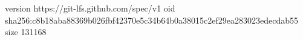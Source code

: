 version https://git-lfs.github.com/spec/v1
oid sha256:c8b18aba88369b026fbf42370e5c34b64b0a38015c2ef29ea283023edecdab55
size 131168
